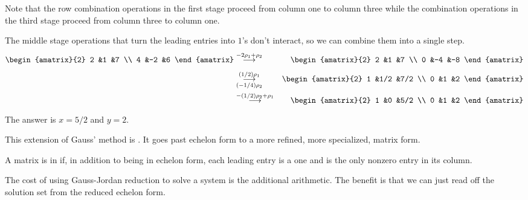 Note that the row combination operations in the first stage proceed from column
one to column three while the combination operations in the third stage proceed 
from column three to column one.

\begin{example}
The middle stage operations that 
turn the leading entries into \( 1 \)'s
don't interact, so we can combine them into a single step.
\begin{eqnarray*}
    \begin{amatrix}{2}
       2   &1   &7   \\
       4   &-2  &6
    \end{amatrix}
  &\grstep{-2\rho_1+\rho_2}
  &\begin{amatrix}{2}
       2   &1   &7   \\
       0   &-4  &-8
    \end{amatrix}                                   \\
  &\grstep[(-1/4)\rho_2]{(1/2)\rho_1}
  &\begin{amatrix}{2}
       1   &1/2   &7/2   \\
       0   &1     &2
    \end{amatrix}                                    \\
  &\grstep{-(1/2)\rho_2+\rho_1}
  &\begin{amatrix}{2}
       1   &0   &5/2   \\
       0   &1   &2
    \end{amatrix}
\end{eqnarray*}
The answer is $x=5/2$ and $y=2$.
\end{example}

This extension of Gauss' method is 
.
It goes past echelon form to a more refined, more specialized,
matrix form.

\begin{definition}\label{def:RedEchForm}
A matrix is in
if, in addition to being in echelon form, each leading entry is a
one and is the only nonzero entry in its column.
\end{definition}

\noindent
The cost of using Gauss-Jordan reduction to solve a system 
is the additional arithmetic.
The benefit is that we can just read off the solution set
from the reduced echelon form.

